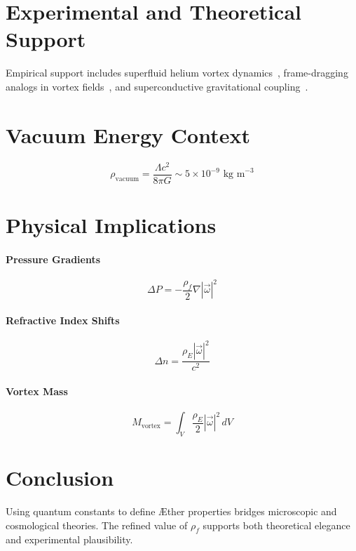 \documentclass[12pt]{article}
\begin{document}
\section{Experimental and Theoretical Support}

Empirical support includes superfluid helium vortex dynamics~\cite{jackson2021}, frame-dragging analogs in vortex fields~\cite{paris2015}, and superconductive gravitational coupling~\cite{santiago2011}.

\section{Vacuum Energy Context}

\[
\rho_{\text{vacuum}} = \frac{\Lambda c^2}{8 \pi G} \sim 5 \times 10^{-9} \text{ kg m}^{-3}
\]

\section{Physical Implications}

\paragraph{Pressure Gradients}
\[
\Delta P = -\frac{\rho_{\scriptscriptstyle\boldsymbol\!f}}{2} \nabla |\vec{\omega}|^2
\]

\paragraph{Refractive Index Shifts}
\[
\Delta n = \frac{\rho_{\scriptscriptstyle\boldsymbol\!E} |\vec{\omega}|^2}{c^2}
\]

\paragraph{Vortex Mass}
\[
M_{\text{vortex}} = \int_V \frac{\rho_{\scriptscriptstyle\boldsymbol\!E}}{2} |\vec{\omega}|^2 \, dV
\]

\section{Conclusion}

Using quantum constants to define Æther properties bridges microscopic and cosmological theories. The refined value of $\rho_{\scriptscriptstyle\boldsymbol\!f}$ supports both theoretical elegance and experimental plausibility.


\ifdefined\standalonechapter\else
    
    
    
\end{document}
